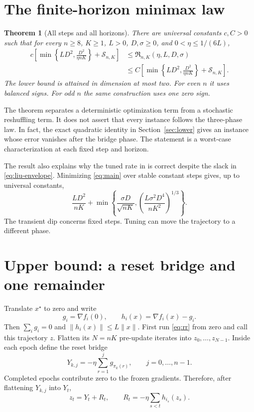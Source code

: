 \documentclass{article}
\newtheorem{theorem}{Theorem}
\theoremstyle{remark}
\newcommand{\Risk}{\mathfrak R}
\newcommand{\Stoch}{\mathcal S}
\newcommand{\1}{\mathbf 1}
\begin{document}
\section{The finite-horizon minimax law}

\begin{theorem}[All steps and all horizons]\label{thm:main}
There are universal constants $c,C>0$ such that for every $n\geq8$, $K\geq1$, $L>0$, $D,\sigma\geq0$, and $0<\eta\leq1/(6L)$,
\begin{align}
 c\left[
  \min\left\{LD^2,\frac{D^2}{\eta nK}\right\}
  +\Stoch_{n,K}\right]
 &\leq \Risk_{n,K}(\eta,L,D,\sigma) \nonumber\\
 &\leq C\left[
  \min\left\{LD^2,\frac{D^2}{\eta nK}\right\}
  +\Stoch_{n,K}\right].                         \label{eq:main}
\end{align}
The lower bound is attained in dimension at most two. For even $n$ it uses balanced signs. For odd $n$ the same construction uses one zero sign.
\end{theorem}

The theorem separates a deterministic optimization term from a stochastic reshuffling term. It does not assert that every instance follows the three-phase law. In fact, the exact quadratic identity in Section~\ref{sec:lower} gives an instance whose error vanishes after the bridge phase. The statement is a worst-case characterization at each fixed step and horizon.

The result also explains why the tuned rate in \citet{liu2026dominates} is correct despite the slack in \eqref{eq:liu-envelope}. Minimizing \eqref{eq:main} over stable constant steps gives, up to universal constants,
\begin{equation}
 \frac{LD^2}{nK}
 +\min\left\{
   \frac{\sigma D}{\sqrt{nK}},
   \left(\frac{L\sigma^2D^4}{nK^2}\right)^{1/3}
 \right\}.                                             \label{eq:tuned}
\end{equation}
The transient dip concerns fixed steps. Tuning can move the trajectory to a different phase.

\section{Upper bound: a reset bridge and one remainder}
\label{sec:upper}

Translate $x^\star$ to zero and write \[ g_i=\nabla f_i(0), \qquad h_i(x)=\nabla f_i(x)-g_i. \] Then $\sum_i g_i=0$ and $\|h_i(x)\|\leq L\|x\|$. First run \eqref{eq:rr} from zero and call this trajectory $z$. Flatten its $N=nK$ pre-update iterates into $z_0,\ldots,z_{N-1}$. Inside each epoch define the reset bridge
\begin{equation}
 Y_{k,j}=-\eta\sum_{r=1}^j g_{\pi_k(r)},
 \qquad j=0,\ldots,n-1.                              \label{eq:bridge}
\end{equation}
Completed epochs contribute zero to the frozen gradients. Therefore, after flattening $Y_{k,j}$ into $Y_t$,
\begin{equation}
 z_t=Y_t+R_t,
 \qquad
 R_t=-\eta\sum_{s<t}h_{i_s}(z_s).                    \label{eq:remainder}
\end{equation}
\end{document}
